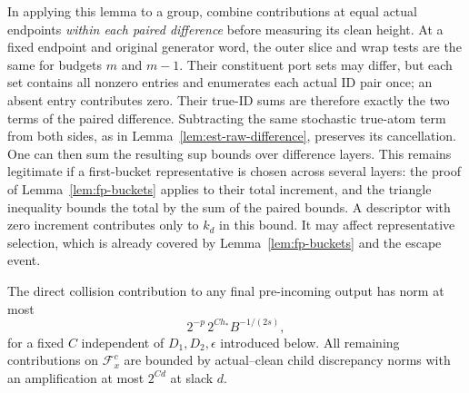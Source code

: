 In applying this lemma to a group, combine contributions at equal actual
endpoints \emph{within each paired difference} before measuring its
clean height.  At a fixed endpoint and original generator word, the
outer slice and wrap tests are the same for budgets $m$ and $m-1$.
Their constituent port sets may differ, but each set contains all
nonzero entries and enumerates each actual ID pair once; an absent
entry contributes zero.  Their true-ID sums are therefore exactly the
two terms of the paired difference.  Subtracting the same stochastic
true-atom term from both sides, as in
Lemma~\ref{lem:est-raw-difference}, preserves its cancellation.
One can then sum the resulting sup bounds over difference layers.
This remains legitimate
if a first-bucket representative is chosen across several layers:
the proof of Lemma~\ref{lem:fp-buckets} applies to their total increment,
and the triangle inequality bounds the total by the sum of the paired
bounds.  A descriptor with zero increment contributes only to $k_d$ in
this bound.  It may affect representative selection, which is already
covered by Lemma~\ref{lem:fp-buckets} and the escape event.

\begin{lemma}\label{lem:fp-direct}
The direct collision contribution to any final pre-incoming output has
norm at most
\begin{equation}
             2^{-p}\,2^{C h_*}B^{-1/(2s)},
 \label{eq:fp-direct-charge}
\end{equation}
for a fixed $C$ independent of $D_1,D_2,\epsilon$ introduced below.
All remaining contributions on $\mathcal F_x^c$ are bounded by
actual--clean child discrepancy norms with an amplification at most
$2^{C d}$ at slack $d$.
\end{lemma}


